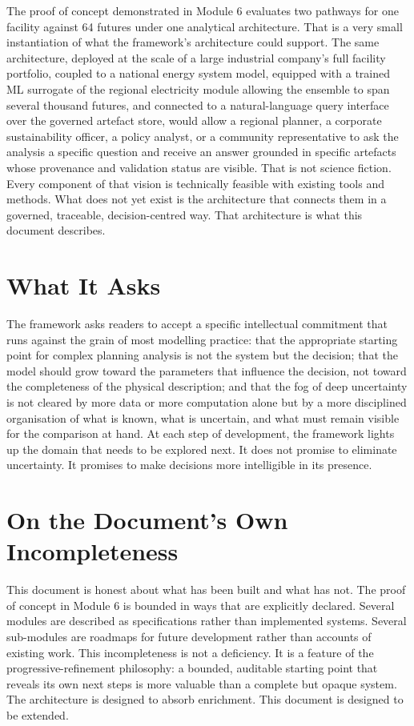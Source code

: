 \documentclass[
  11pt,
  a4paper,
  twoside,
  openright]{scrbook}
\begin{document}
The proof of concept demonstrated in Module 6 evaluates two pathways for
one facility against 64 futures under one analytical architecture. That
is a very small instantiation of what the framework's architecture could
support. The same architecture, deployed at the scale of a large
industrial company's full facility portfolio, coupled to a national
energy system model, equipped with a trained ML surrogate of the
regional electricity module allowing the ensemble to span several
thousand futures, and connected to a natural-language query interface
over the governed artefact store, would allow a regional planner, a
corporate sustainability officer, a policy analyst, or a community
representative to ask the analysis a specific question and receive an
answer grounded in specific artefacts whose provenance and validation
status are visible. That is not science fiction. Every component of that
vision is technically feasible with existing tools and methods. What
does not yet exist is the architecture that connects them in a governed,
traceable, decision-centred way. That architecture is what this document
describes.

\section{What It Asks}\label{what-it-asks}

The framework asks readers to accept a specific intellectual commitment
that runs against the grain of most modelling practice: that the
appropriate starting point for complex planning analysis is not the
system but the decision; that the model should grow toward the
parameters that influence the decision, not toward the completeness of
the physical description; and that the fog of deep uncertainty is not
cleared by more data or more computation alone but by a more disciplined
organisation of what is known, what is uncertain, and what must remain
visible for the comparison at hand. At each step of development, the
framework lights up the domain that needs to be explored next. It does
not promise to eliminate uncertainty. It promises to make decisions more
intelligible in its presence.

\section{On the Document's Own
Incompleteness}\label{on-the-documents-own-incompleteness}

This document is honest about what has been built and what has not. The
proof of concept in Module 6 is bounded in ways that are explicitly
declared. Several modules are described as specifications rather than
implemented systems. Several sub-modules are roadmaps for future
development rather than accounts of existing work. This incompleteness
is not a deficiency. It is a feature of the progressive-refinement
philosophy: a bounded, auditable starting point that reveals its own
next steps is more valuable than a complete but opaque system. The
architecture is designed to absorb enrichment. This document is designed
to be extended.
\end{document}
